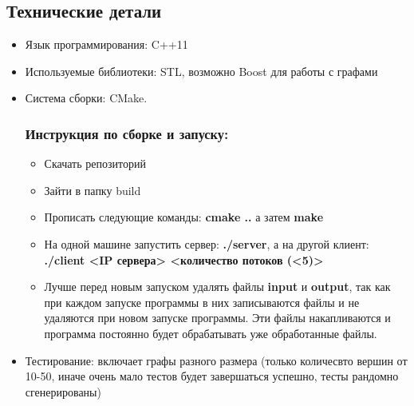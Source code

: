 \documentclass{article}
\begin{document}
\subsection*{Технические детали}
\begin{itemize}
    \item Язык программирования: C++11
    \item Используемые библиотеки: STL, возможно Boost для работы с графами
    \item Система сборки: CMake. 
    \subsubsection*{Инструкция по сборке и запуску:}
    \begin{itemize}
        \item Скачать репозиторий
        \item Зайти в папку build
        \item Прописать следующие команды: \textbf{cmake ..} а затем \textbf{make}
        \item На одной машине запустить сервер: \textbf{./server}, а на другой клиент: \textbf{./client <IP сервера> <количество потоков (<5)>}
        \item Лучше перед новым запуском удалять файлы \textbf{input} и \textbf{output}, так как при каждом запуске программы в них записываются файлы и не удаляются при новом запуске программы. Эти файлы накапливаются и программа постоянно будет обрабатывать уже обработанные файлы.
    \end{itemize}
    \item Тестирование: включает графы разного размера (только количесвто вершин от 10-50, иначе очень мало тестов будет завершаться успешно, тесты рандомно сгенерированы)
\end{itemize}
\end{document}
